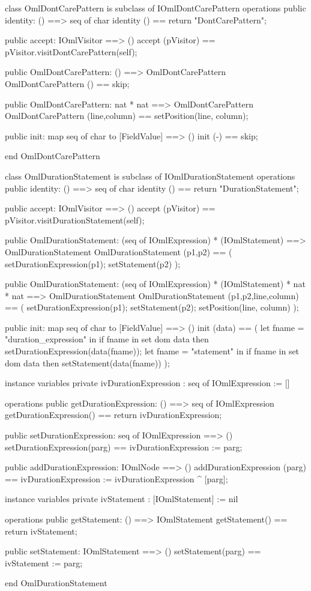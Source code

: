 \begin{vdm_al}
class OmlDontCarePattern is subclass of IOmlDontCarePattern
operations
  public identity: () ==> seq of char
  identity () == return "DontCarePattern";

  public accept: IOmlVisitor ==> ()
  accept (pVisitor) == pVisitor.visitDontCarePattern(self);

  public OmlDontCarePattern:
    () ==> OmlDontCarePattern
  OmlDontCarePattern () == 
    skip;

  public OmlDontCarePattern:
    nat *
    nat ==> OmlDontCarePattern
  OmlDontCarePattern (line,column) == 
    setPosition(line, column);

  public init: map seq of char to [FieldValue] ==> ()
  init (-) == skip;

end OmlDontCarePattern
\end{vdm_al}

\begin{vdm_al}
class OmlDurationStatement is subclass of IOmlDurationStatement
operations
  public identity: () ==> seq of char
  identity () == return "DurationStatement";

  public accept: IOmlVisitor ==> ()
  accept (pVisitor) == pVisitor.visitDurationStatement(self);

  public OmlDurationStatement:
    (seq of IOmlExpression) *
    (IOmlStatement) ==> OmlDurationStatement
  OmlDurationStatement (p1,p2) == 
    ( setDurationExpression(p1);
      setStatement(p2) );

  public OmlDurationStatement:
    (seq of IOmlExpression) *
    (IOmlStatement) *
    nat *
    nat ==> OmlDurationStatement
  OmlDurationStatement (p1,p2,line,column) == 
    ( setDurationExpression(p1);
      setStatement(p2);
      setPosition(line, column) );

  public init: map seq of char to [FieldValue] ==> ()
  init (data) ==
    ( let fname = "duration_expression" in
        if fname in set dom data
        then setDurationExpression(data(fname));
      let fname = "statement" in
        if fname in set dom data
        then setStatement(data(fname)) );

instance variables
  private ivDurationExpression : seq of IOmlExpression := []

operations
  public getDurationExpression: () ==> seq of IOmlExpression
  getDurationExpression() == return ivDurationExpression;

  public setDurationExpression: seq of IOmlExpression ==> ()
  setDurationExpression(parg) == ivDurationExpression := parg;

  public addDurationExpression: IOmlNode ==> ()
  addDurationExpression (parg) == ivDurationExpression := ivDurationExpression ^ [parg];

instance variables
  private ivStatement : [IOmlStatement] := nil

operations
  public getStatement: () ==> IOmlStatement
  getStatement() == return ivStatement;

  public setStatement: IOmlStatement ==> ()
  setStatement(parg) == ivStatement := parg;

end OmlDurationStatement
\end{vdm_al}

